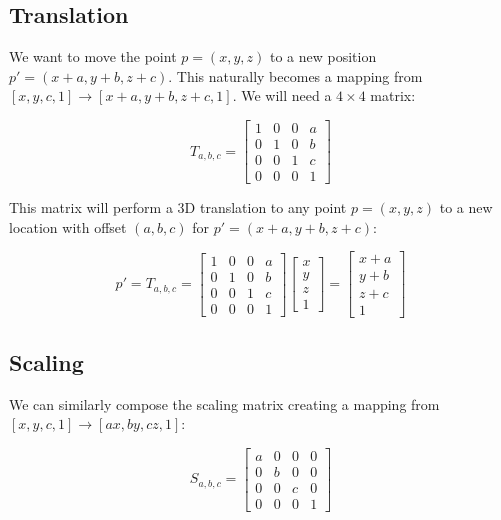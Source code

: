 \documentclass[12pt,letterpaper]{article}
\begin{document}
\subsection{Translation}
We want to move the point $p = (x, y, z)$ to a new position $p' = (x+a, y+b, z+c)$. This naturally becomes a mapping from $[x, y, c, 1] \rightarrow [x+a, y+b, z+c, 1]$. We will need a $4 \times 4$ matrix:

\begin{equation}
    T_{a, b, c} = \begin{bmatrix}
        1 & 0 & 0 & a \\
        0 & 1 & 0 & b \\
        0 & 0 & 1 & c \\
        0 & 0 & 0 & 1
    \end{bmatrix}
\end{equation}

This matrix will perform a 3D translation to any point $p = (x, y, z)$ to a new location with offset $(a, b, c)$ for $p' = (x+a, y+b, z+c)$:

\begin{equation}
    p' = T_{a, b, c} = \begin{bmatrix}
        1 & 0 & 0 & a \\
        0 & 1 & 0 & b \\
        0 & 0 & 1 & c \\
        0 & 0 & 0 & 1
    \end{bmatrix}
    \begin{bmatrix}
        x \\
        y \\
        z \\
        1
    \end{bmatrix}
    = \begin{bmatrix}
        x+a \\
        y+b \\
        z+c \\
        1
    \end{bmatrix}
\end{equation}


\subsection{Scaling}
We can similarly compose the scaling matrix creating a mapping from \\ $[x, y, c, 1] \rightarrow [ax, by, cz, 1]$:

\begin{equation}
    S_{a, b, c} = \begin{bmatrix}
        a & 0 & 0 & 0 \\
        0 & b & 0 & 0 \\
        0 & 0 & c & 0 \\
        0 & 0 & 0 & 1
    \end{bmatrix}
\end{equation}
\end{document}
